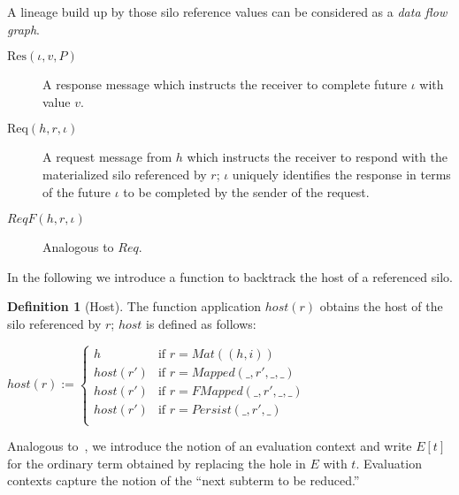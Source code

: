 \documentclass{article}
\theoremstyle{definition}
\newtheorem{defn}{Definition}[section]
\newcommand{\Req}[3]{\text{Req}(#1, #2, #3)}
\newcommand{\Res}[3]{\text{Res}(#1, #2, #3)}
\begin{document}
A lineage build up by those silo reference values can be considered as a {\emph{data flow graph}}\cite{???}. %

\begin{description}
\item[${\Res \iota v P}$] A response message which instructs the receiver to complete future $\iota$ with value $v$. %

\item[${\Req h r \iota}$] A request message from $h$ which instructs the receiver to respond with the materialized silo referenced by $r$; $\iota$ uniquely identifies the response in terms of the future $\iota$ to be completed by the sender of the request.

\item[$ReqF(h, r, \iota)$] Analogous to $Req$.
\end{description}

In the following we introduce a function to backtrack the host of a referenced silo.

\begin{defn}[Host]
  The function application $host(r)$ obtains the host of the silo referenced by $r$; $host$ is defined as follows:
  
  $host(r) := \begin{cases}
    h        & \text{if } r = Mat((h, i)) \\
    host(r') & \text{if } r = Mapped(\_, r', \_, \_) \\
    host(r') & \text{if } r = FMapped(\_, r', \_, \_) \\
    host(r') & \text{if } r = Persist(\_, r', \_) \\
    \end{cases}$
\end{defn}

Analogous to~\cite{TAPL}, we introduce the notion of an evaluation context and write $E[t]$ for the ordinary term obtained by replacing the hole in $E$ with $t$. Evaluation contexts capture the notion of the ``next subterm to be reduced.''
\end{document}
